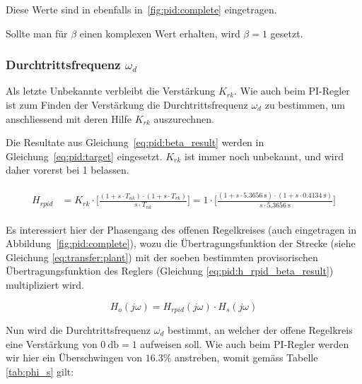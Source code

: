 Diese Werte sind in ebenfalls in~\ref{fig:pid:complete} eingetragen.

Sollte  man  f\"ur  $\beta$  einen komplexen  Wert  erhalten,  wird  $\beta=1$
gesetzt.


\subsubsection{Durchtrittsfrequenz $\omega_d$}

Als  letzte Unbekannte  verbleibt  die Verst\"arkung  $K_{rk}$. Wie auch  beim
PI-Regler ist zum Finden  der Verst\"arkung die Durchtrittsfrequenz $\omega_d$
zu bestimmen, um anschliessend mit deren Hilfe $K_{rk}$ auszurechnen.

Die    Resultate    aus     Gleichung~\ref{eq:pid:beta_result}    werden    in
Gleichung~\ref{eq:pid:target} eingesetzt. $K_{rk}$  ist immer  noch unbekannt,
und wird daher vorerst bei 1 belassen.

\begin{gather} \label{eq:pid:h_rpid_beta_result}
    \begin{split}
        H_{rpid} & = K_{rk} \cdot \biggl[ \frac{(1 + s \cdot T_{nk}               ) \cdot (1 + s \cdot T_{vk}               ) }{ s \cdot T_{nk}               } \biggr]
                   = 1      \cdot \biggl[ \frac{(1 + s \cdot \SI{5.3656}{\second} ) \cdot (1 + s \cdot \SI{0.4134}{\second} ) }{ s \cdot \SI{5.3656}{\second} } \biggr]
    \end{split}
\end{gather}


Es interessiert hier der Phasengang des offenen Regelkreises (auch eingetragen
in   Abbildung~\ref{fig:pid:complete}),    wozu   die   \"Ubertragungsfunktion
der  Strecke   (siehe  Gleichung   \ref{eq:transfer:plant})  mit   der  soeben
bestimmten  provisorischen   \"Ubertragungsfunktion  des   Reglers  (Gleichung
\ref{eq:pid:h_rpid_beta_result}) multipliziert wird.

\begin{equation} \label{eq:pid:h_o_k_rk_one}
    H_{o}(j\omega) = H_{rpid}(j\omega) \cdot H_s(j\omega)
\end{equation}

Nun wird  die Durchtrittsfrequenz $\omega_d$  bestimmt, an welcher  der offene
Regelkreis eine  Verst\"arkung von $\SI{0}{\decibel} =  1$ aufweisen soll. Wie
auch  beim  PI-Regler  werden  wir   hier  ein  \"Uberschwingen  von  $16.3\%$
anstreben, womit gem\"ass Tabelle \ref{tab:phi_s} gilt:

